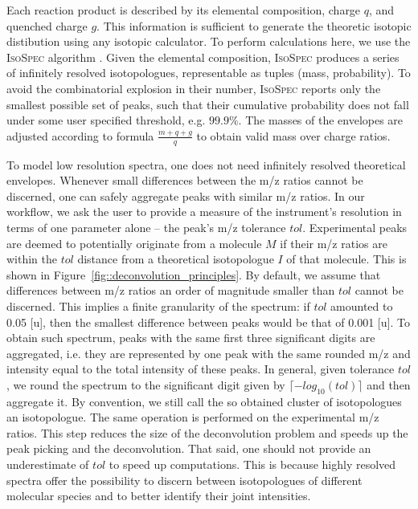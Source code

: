\documentclass[journal=ancham, manuscript=article, layout=twocolumn]{achemso}
\begin{document}
Each reaction product is described by its elemental composition, charge $q$, and quenched charge $g$. 
This information is sufficient to generate the theoretic isotopic distibution using any isotopic calculator. 
To perform calculations here, we use the \textsc{IsoSpec} algorithm \cite{lacki2017isospec}. 
Given the elemental composition, \textsc{IsoSpec} produces a series of infinitely resolved isotopologues, representable as tuples (mass, probability). 
To avoid the combinatorial explosion in their number\cite{Valkenborg2012Isotopic}, \textsc{IsoSpec} reports only the smallest possible set of peaks, such that their cumulative probability does not fall under some user specified threshold, e.g. $99.9\%$. 
The masses of the envelopes are adjusted according to formula $\frac{m+q+g}{q}$ to obtain valid mass over charge ratios.

To model low resolution spectra, one does not need infinitely resolved theoretical envelopes. 
Whenever small differences between the m/z ratios cannot be discerned, one can safely aggregate peaks with similar m/z ratios.
In our workflow, we ask the user to provide a measure of the instrument's resolution in terms of one parameter alone -- the peak's m/z tolerance $tol$.
Experimental peaks are deemed to potentially originate from a molecule $M$ if their m/z ratios are within the $tol$ distance from a theoretical isotopologue $I$ of that molecule. 
This is shown in Figure~\ref{fig::deconvolution_principles}. 
By default, we assume that differences between m/z ratios an order of magnitude smaller than $tol$ cannot be discerned. 
This implies a finite granularity of the spectrum: if $tol$ amounted to 0.05 [u], then the smallest difference between peaks would be that of 0.001 [u].  
To obtain such spectrum, peaks with the same first three significant digits are aggregated, i.e. they are represented by one peak with the same rounded m/z and intensity equal to the total intensity of these peaks. 
In general, given tolerance $tol$, we round the spectrum to the significant digit given by $\lceil - log_{10}(tol)\rceil$ and then aggregate it. 
By convention, we still call the so obtained cluster of isotopologues an isotopologue.
The same operation is performed on the experimental m/z ratios.
This step reduces the size of the deconvolution problem and speeds up the peak picking and the deconvolution.
That said, one should not provide an underestimate of $tol$ to speed up computations.
This is because highly resolved spectra offer the possibility to discern between isotopologues of different molecular species and to better identify their joint intensities.
\end{document}
